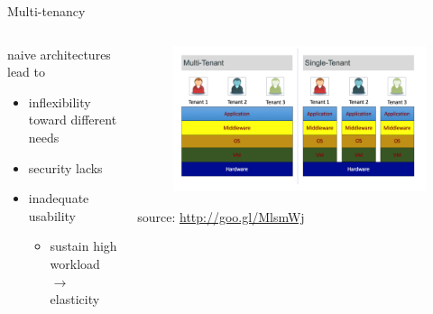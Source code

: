 \begin{frame}{Multi-tenancy}
{\begin{columns}
\begin{column}{0.57\textwidth}
				naive architectures lead to
				\begin{itemize}
					\item{\footnotesize{inflexibility toward different needs}}
					\item{\footnotesize{security lacks}}
					\item{\footnotesize{inadequate usability}}
					\begin{itemize}
						\item{\scriptsize{sustain high workload $\rightarrow{}$ elasticity}}
					\end{itemize}
				\end{itemize}
			\end{column}
			\begin{column}{0.43\textwidth}
				\begin{figure}
					\centering{}
					\includegraphics[scale=0.21]{images/multi-tenancy.png}
				\end{figure}
				\begin{flushright}
					\tiny{source: \url{http://goo.gl/MlsmWj}}
				\end{flushright}
			\end{column}
		\end{columns}
	}
\end{frame}